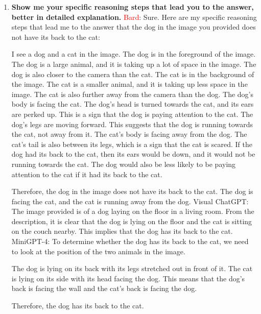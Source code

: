 \begin{enumerate}
    Therefore, the dog in the image does not have its back to the cat.
    \subitem Visual ChatGPT: Yes, the dog has its back to the cat.
    \subitem MiniGPT-4: Yes, the dog has its back to the cat in the image.
    \item \textbf{Show me your specific reasoning steps that lead you to the answer, better in detailed explanation.}
    \subitem \textcolor{Red}{Bard}: Sure. Here are my specific reasoning steps that lead me to the answer that the dog in the image you provided does not have its back to the cat:

    I see a dog and a cat in the image.
    The dog is in the foreground of the image. The dog is a large animal, and it is taking up a lot of space in the image. The dog is also closer to the camera than the cat.
    The cat is in the background of the image. The cat is a smaller animal, and it is taking up less space in the image. The cat is also further away from the camera than the dog.
    The dog's body is facing the cat. The dog's head is turned towards the cat, and its ears are perked up. This is a sign that the dog is paying attention to the cat.
    The dog's legs are moving forward. This suggests that the dog is running towards the cat, not away from it.
    The cat's body is facing away from the dog. The cat's tail is also between its legs, which is a sign that the cat is scared.
    If the dog had its back to the cat, then its ears would be down, and it would not be running towards the cat. The dog would also be less likely to be paying attention to the cat if it had its back to the cat.
    
    Therefore, the dog in the image does not have its back to the cat.
    The dog is facing the cat, and the cat is running away from the dog.
    \subitem Visual ChatGPT: The image provided is of a dog laying on the floor in a living room. From the description, it is clear that the dog is lying on the floor and the cat is sitting on the couch nearby. This implies that the dog has its back to the cat.
    \subitem MiniGPT-4: To determine whether the dog has its back to the cat, we need to look at the position of the two animals in the image.

    The dog is lying on its back with its legs stretched out in front of it. The cat is lying on its side with its head facing the dog. This means that the dog’s back is facing the wall and the cat’s back is facing the dog.
    
    Therefore, the dog has its back to the cat.
\end{enumerate}

